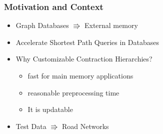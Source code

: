 \begin{frame}
    \frametitle{Motivation and Context}
    \begin{itemize}
        \item Graph Databases $\Rrightarrow$ External memory
        \item Accelerate Shortest Path Queries in Databases 
        \item Why Customizable Contraction Hierarchies? 
        \begin{itemize}
            \item fast for main memory applications
            \item reasonable preprocessing time
            \item It is updatable
        \end{itemize}
        \item Test Data $\Rrightarrow$ Road Networks
    \end{itemize}

\end{frame}